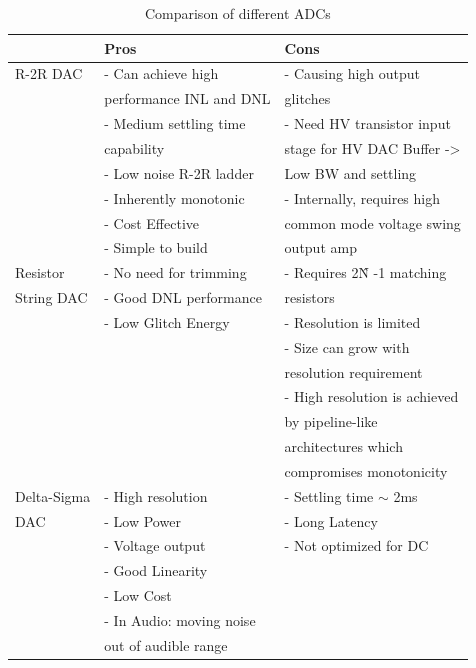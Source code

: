 \documentclass[english, 12pt, a4paper]{ifimaster}
\begin{document}
\begin{table}[!ht]
  \centering
 \begin{tabular}{|l|l|l|}
 \hline
			& Pros       			& Cons   			\\ \hline
R-2R DAC 		& - Can achieve high		& - Causing high output 	\\
			& performance INL and DNL	& glitches		   	\\ 
			& - Medium settling time	& - Need HV transistor input	\\
			& capability			&  stage for HV DAC Buffer ->	\\
			& - Low noise R-2R ladder	&  Low BW and settling		\\
			& - Inherently monotonic	& - Internally, requires high 	\\
			& - Cost Effective		& common mode voltage swing 	\\
			& - Simple to build 		& output amp		 	\\ \hline
Resistor		& - No need for trimming	& - Requires 2\^N -1 matching 	\\
String DAC		& - Good DNL performance	& resistors			\\
			& - Low Glitch Energy		& - Resolution is limited	\\ 
			& 				& - Size can grow with 		\\
			&				& resolution requirement	\\
			& 				& - High resolution is achieved \\
			&				& by pipeline-like		\\
			& 				& architectures which 		\\
			&				& compromises monotonicity	\\ \hline
Delta-Sigma		& - High resolution		& - Settling time \(\sim\) 2ms	\\
DAC			& - Low Power			& - Long Latency		\\
			& - Voltage output		& -  Not optimized for DC	\\
			& - Good Linearity		&				\\
			& - Low Cost			&				\\
			& - In Audio: moving noise	&				\\
			& out of audible range		&				\\ \hline
 \end{tabular}
 \caption{Comparison of different ADCs}
 \label{dac:comparison}
 \end{table}
 
\end{document}
